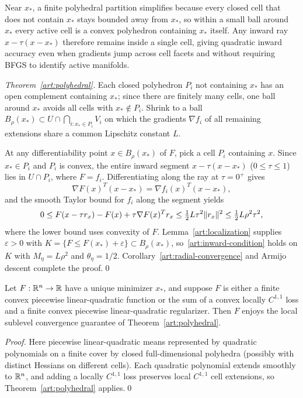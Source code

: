 Near $x_*$, a finite polyhedral partition simplifies because every closed
cell that does not contain $x_*$ stays bounded away from $x_*$, so within a
small ball around $x_*$ every active cell is a convex polyhedron containing
$x_*$ itself. Any inward ray $x-\tau(x-x_*)$ therefore remains inside a single
cell, giving quadratic inward accuracy even when gradients jump across cell
facets and without requiring BFGS to identify active manifolds.



\begin{proof}[Theorem~\ref{art:polyhedral}]
Each closed polyhedron $P_i$ not containing $x_*$ has an open complement
containing $x_*$; since there are finitely many cells, one ball around $x_*$
avoids all cells with $x_*\notin P_i$. Shrink to a ball
$B_\rho(x_*)\subset U\cap\bigcap_{i:x_*\in P_i}V_i$ on which the gradients
$\nabla f_i$ of all remaining extensions share a common Lipschitz constant $L$.

At any differentiability point $x\in B_\rho(x_*)$ of $F$, pick a cell $P_i$
containing $x$. Since $x_*\in P_i$ and $P_i$ is convex, the entire inward
segment $x-\tau(x-x_*)$ ($0\le\tau\le1$) lies in $U\cap P_i$, where $F=f_i$.
Differentiating along the ray at $\tau=0^+$ gives
\[
 \nabla F(x)^T(x-x_*)=\nabla f_i(x)^T(x-x_*),
\]
and the smooth Taylor bound for $f_i$ along the segment yields
\[
 0\le F(x-\tau r_x)-F(x)+\tau\nabla F(x)^Tr_x
       \le\tfrac12L\tau^2\lVert r_x\rVert^2
       \le\tfrac12L\rho^2\tau^2,
\]
where the lower bound uses convexity of $F$. Lemma~\ref{art:localization}
supplies $\varepsilon>0$ with $K=\{F\le F(x_*)+\varepsilon\}\subset B_\rho(x_*)$,
so~\eqref{art:inward-condition} holds on $K$ with $M_\eta=L\rho^2$ and
$\theta_\eta=1/2$. Corollary~\ref{art:radial-convergence} and Armijo descent
complete the proof.\qed
\end{proof}

\begin{corollary}\label{art:plq}
Let $F:\mathbb R^n\to\mathbb R$ have a unique minimizer $x_*$, and suppose $F$ is either a
finite convex piecewise linear-quadratic function or the sum of a convex locally
$C^{1,1}$ loss and a finite convex piecewise linear-quadratic regularizer. Then
$F$ enjoys the local sublevel convergence guarantee of
Theorem~\ref{art:polyhedral}.
\end{corollary}
\begin{proof}
Here piecewise linear-quadratic means represented by quadratic polynomials on a
finite cover by closed full-dimensional polyhedra (possibly with distinct
Hessians on different cells). Each quadratic polynomial extends smoothly to
$\mathbb R^n$, and adding a locally $C^{1,1}$ loss preserves local $C^{1,1}$ cell
extensions, so Theorem~\ref{art:polyhedral} applies.\qed
\end{proof}

